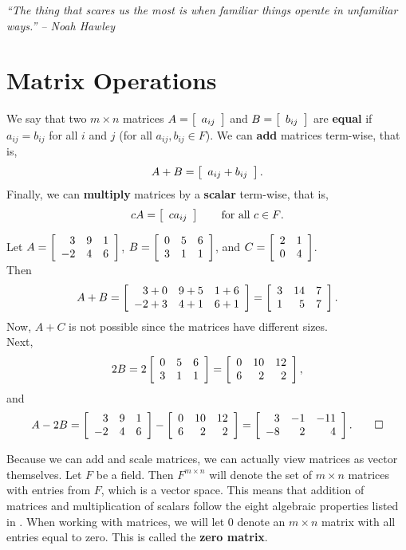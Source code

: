\begin{center} 
\emph{``The thing that scares us the most is when familiar things operate in unfamiliar ways.'' -- Noah Hawley}
\end{center}

\section{Matrix Operations}\label{sec:matrix}
We say that two $m\times n$ matrices $A = \mtx{r}{a_{ij}}$ and $B = \mtx{r}{b_{ij}}$ are \textbf{equal} if $a_{ij} = b_{ij}$ for all $i$ and $j$ (for all $a_{ij}, b_{ij}\in F$). We can \textbf{add} matrices term-wise,  that is, 
\[A + B = \mtx{r}{a_{ij}+b_{ij}}.\] Finally, we can \textbf{multiply} matrices by a \textbf{scalar} term-wise, that is, 
\[cA = \mtx{r}{ca_{ij}}\qquad\text{for all $c\in F$}.\]\vs

\begin{Exam} Let $A = \mtx{rrr}{3&9&1\\-2&4&6}$, $B = \mtx{rrr}{0&5&6\\3&1&1}$, and $C = \mtx{rr}{2&1\\0&4}$.\\

Then \[A + B = \mtx{rrr}{3+0&9+5&1+6\\-2+3&4+1&6+1} = \mtx{rrr}{3&14&7\\1&5&7}.\] Now, $A+C$ is not possible since the matrices have different sizes.\\

Next, \[2B = 2\mtx{rrr}{0&5&6\\3&1&1} = \mtx{rrr}{0&10&12\\6&2&2},\] and \[A - 2B =  \mtx{rrr}{3&9&1\\-2&4&6} - \mtx{rrr}{0&10&12\\6&2&2} = \mtx{rrr}{3&-1&-11\\-8&2&4}.\qedhere\]
\end{Exam}\vs

Because we can add and scale matrices, we can actually view matrices as vector themselves. Let $F$ be a field. Then $F^{m\times n}$ will denote the set of $m\times n$ matrices with entries from $F$, which is a vector space. This means that addition of matrices and multiplication of scalars follow the eight algebraic properties listed in . When working with matrices, we will let $0$ denote an $m\times n$ matrix with all entries equal to zero. This is called the \textbf{zero matrix}.\\

